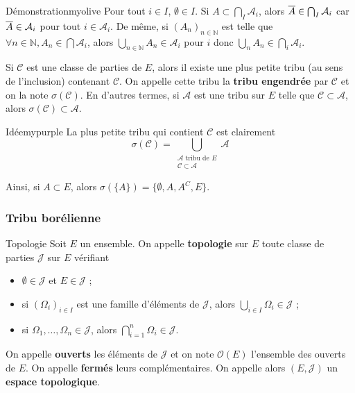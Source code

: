     \begin{demo}{Démonstration}{myolive}
        Pour tout $i \in I$, $\emptyset \in I$. Si $A \subset \bigcap_{I} \mathcal{A}_i$, alors $\overline{A} \in \bigcap_{I} \mathcal{A}_i$ car $\overline{A} \in \mathcal{A}_i$ pour tout $i \in \mathcal{A}_i$. De même, si $(A_n)_{n \in \mathbb{N}}$ est telle que $\forall n \in \mathbb{N}, A_n \in \bigcap \mathcal{A}_i$, alors $\bigcup_{n \in \mathbb{N}} A_n \in \mathcal{A}_i$ pour $i$ donc $\bigcup_n A_n \in \bigcap_i \mathcal{A}_i$.
    \end{demo}

    \begin{defitheo}{}{}
        Si $\mathcal{C}$ est une classe de parties de $E$, alors il existe une plus petite tribu (au sens de l’inclusion) contenant $\mathcal{C}$. On appelle cette tribu la \textbf{tribu engendrée} par $\mathcal{C}$ et on la note $\sigma(\mathcal{C})$. En d’autres termes, si $\mathcal{A}$ est une tribu sur $E$ telle que $\mathcal{C} \subset \mathcal{A}$, alors $\sigma(\mathcal{C}) \subset \mathcal{A}$.
    \end{defitheo}

    \begin{demo}{Idée}{mypurple}
        La plus petite tribu qui contient $\mathcal{C}$ est clairement 
        \[ \sigma(\mathcal{C}) = \bigcup_{\substack{\mathcal{A} \text{ tribu de } E \\ \mathcal{C} \subset \mathcal{A}}} \mathcal{A} \]
    \end{demo}

    Ainsi, si $A \subset E$, alors $\sigma(\{A\}) = \{ \emptyset, A, A^{C}, E \}$.

    \subsubsection{Tribu borélienne}

    \begin{defi}{Topologie}{}
        Soit $E$ un ensemble. On appelle \textbf{topologie} sur $E$ toute classe de parties $\mathcal{J}$ sur $E$ vérifiant 
        \begin{itemize}
            \item $\emptyset \in \mathcal{J}$ et $E \in \mathcal{J}$ ;
            \item si $(\Omega_i)_{i \in I}$ est une famille d’éléments de $\mathcal{J}$, alors $\bigcup_{i \in I} \Omega_i \in \mathcal{J}$ ;
            \item si $\Omega_1,\ldots,\Omega_n \in \mathcal{J}$, alors $\bigcap_{i=1}^n \Omega_i \in \mathcal{J}$.
        \end{itemize}
        On appelle \textbf{ouverts} les éléments de $\mathcal{J}$ et on note $\mathcal{O}(E)$ l’ensemble des ouverts de $E$. On appelle \textbf{fermés} leurs complémentaires. On appelle alors $(E,\mathcal{J})$ un \textbf{espace topologique}.
    \end{defi}

